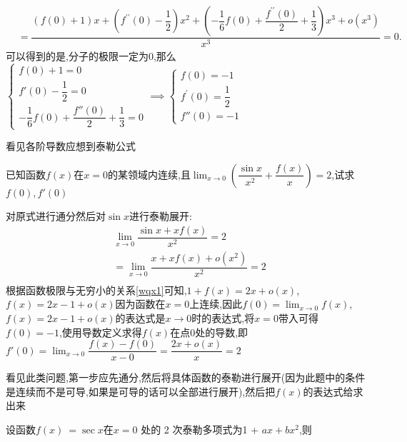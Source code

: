 \documentclass[12pt, a4paper, oneside, UTF8]{ctexbook}
\begin{document}
\begin{sloppypar}
\begin{solution}
\begin{equation*}
\begin{split}
            & = \dfrac{(f(0)+1)x+(f^{\prime\prime}(0)-\dfrac{1}{2})x^{2}+(-\dfrac{1}{6}f(0)+\dfrac{f^{\prime\prime}(0)}{2}+\dfrac{1}{3})x^{3}+o(x^{3})}{x^{3}}=0.
    \end{split}
    \end{equation*}    
    可以得到的是,分子的极限一定为0,那么$\begin{cases}f(0)+1=0\\f'(0)-\dfrac{1}{2}=0\\-\dfrac{1}{6}f(0)+\dfrac{f''(0)}{2}+\dfrac{1}{3}=0\end{cases}\implies \begin{cases}f(0)=-1\\f^{\prime}(0)=\dfrac{1}{2}\\f''(0)=-1\end{cases}$
    \end{solution}
    \begin{note}
        看见各阶导数应想到泰勒公式
    \end{note}
    \begin{problem}
        已知函数$f(x)$在$x=0$的某领域内连续,且$\lim_{x \to 0}(\dfrac{\sin x}{x^2}+\dfrac{f(x)}{x})=2$,试求$f(0),f'(0)$
    \end{problem}
    \begin{solution}
        对原式进行通分然后对$\sin x$进行泰勒展开:
        \begin{equation*}
            \begin{split}    
                & \lim_{x \to 0}\dfrac{\sin x+xf(x)}{x^2}=2\\
                & = \lim_{x \to 0}\dfrac{x+xf(x)+o(x^2)}{x^2}=2 \\
            \end{split}
        \end{equation*} 
    根据函数极限与无穷小的关系\ref{wqx1}可知,$1+f(x)=2x+o(x)$,$f(x)=2x-1+o(x)$因为函数在$x=0$上连续,因此$f(0)=\lim_{x\to 0}f(x)$,$f(x)=2x-1+o(x)$的表达式是$x\to 0$时的表达式,将$x=0$带入可得$f(0)=-1$,使用导数定义求得$f(x)$在点0处的导数,即$f'(0)=\lim_{x \to 0}\dfrac{f(x)-f(0)}{x-0}=\dfrac{2x+o(x)}{x}=2$
    \end{solution}
    \begin{note}
        看见此类问题,第一步应先通分,然后将具体函数的泰勒进行展开(因为此题中的条件是连续而不是可导,如果是可导的话可以全部进行展开),然后把$f(x)$的表达式给求出来
    \end{note}
    \begin{problem}
        设函数$f(x)\:=\sec x$在$x=0$ 处的 2 次泰勒多项式为1 + $ax+bx^2$,则\\

\end{problem}
\end{sloppypar}
\end{document}
